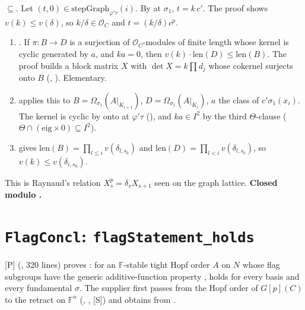 \documentclass[11pt]{article}
\newcommand{\mP}{\textsf{[P]}}
\newcommand{\mS}{\textsf{[S]}}
\newcommand{\cO}{\mathcal O}
\newcommand{\Fq}{\mathbb F}
\theoremstyle{remark}
\begin{document}
$\subseteq$. Let $(t,0)\in\mathrm{stepGraph}_{\varphi'\tau}(i)$. By  at $\sigma_1$, $t=k\,c'$. The proof shows $v(k)\le v(\delta)$, so $k/\delta\in\cO_C$ and $t=(k/\delta)c^p$.
\begin{enumerate}[nosep]
\item {}. If $\pi:B\to D$ is a surjection of $\cO_C$-modules of finite length whose kernel is cyclic generated by $a$, and $k a=0$, then $v(k)\cdot\mathrm{len}(D)\le\mathrm{len}(B)$. The proof builds a block matrix $X$ with $\det X=k\prod d_j$ whose cokernel surjects onto $B$ (, ). Elementary.
\item {} applies this to $B=\Omega_{\sigma_1}(A|_{K_{i+1}})$, $D=\Omega_{\sigma_1}(A|_{K_i})$, $a$ the class of $c'\sigma_1(x_i)$. The kernel is cyclic by \textsf{onto} at $\varphi'\tau$ (), and $k a\in I^2$ by the third $\Theta$-clause ($\Theta\cap(\mathrm{eig}\times0)\subseteq I^2$).
\item {} gives $\mathrm{len}(B)=\prod_{l\le i}v(\delta_{l,s_0})$ and $\mathrm{len}(D)=\prod_{l<i}v(\delta_{l,s_0})$, so $v(k)\le v(\delta_{i,s_0})$.
\end{enumerate}
This is Raynaud's relation $X_s^p=\delta_sX_{s+1}$ seen on the graph lattice. \textbf{Closed modulo .}

\section{\texttt{FlagConcl}: \texttt{flagStatement\_holds}}\label{sec:flag}

\mP{}  (, 320 lines) proves : for an $\Fq$-stable tight Hopf order $A$ on $N$ whose flag subgroups have the generic additive-function property ,  holds for every basis and every fundamental $\sigma$. The supplier  first passes from the Hopf order of $G[p](C)$ to the retract on $\Fq^n$ (, , \mS) and obtains  from .
\end{document}

